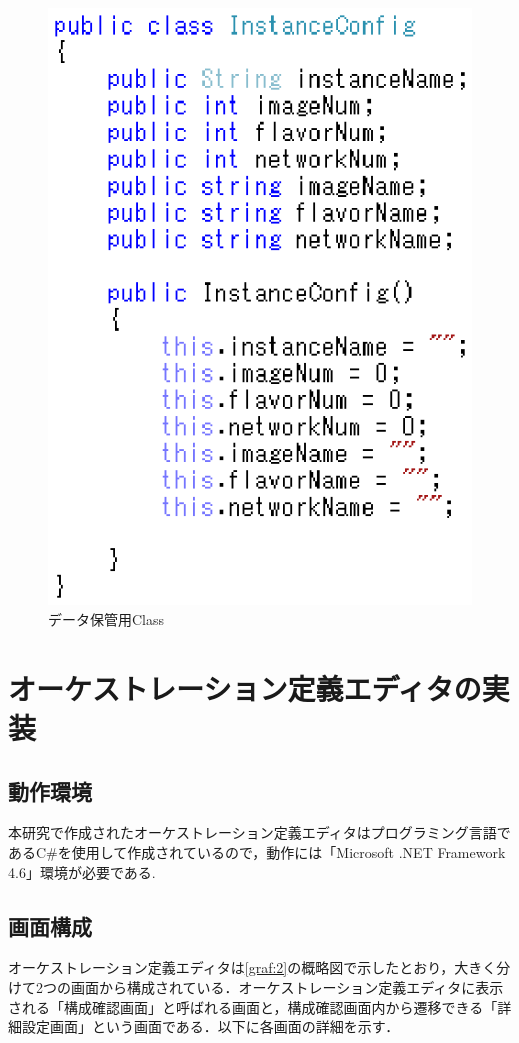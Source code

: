 \documentclass[mingoth]{kut-paper}		%
\begin{document}
	\begin{figure}[H]
		\begin{center}
			\includegraphics[scale=1.3]{Document/Source1.eps}
			\caption{データ保管用Class}
			\label{graf:3}
		\end{center}
	\end{figure}
	
\chapter{オーケストレーション定義エディタの実装}
	\section{動作環境}
	本研究で作成されたオーケストレーション定義エディタはプログラミング言語であるC\#を使用して作成されているので，動作には「Microsoft .NET Framework 4.6」環境が必要である.
	\section{画面構成}
	オーケストレーション定義エディタは\ref{graf:2}の概略図で示したとおり，大きく分けて2つの画面から構成されている．オーケストレーション定義エディタに表示される「構成確認画面」と呼ばれる画面と，構成確認画面内から遷移できる「詳細設定画面」という画面である．以下に各画面の詳細を示す．
	\newpage
\end{document}
